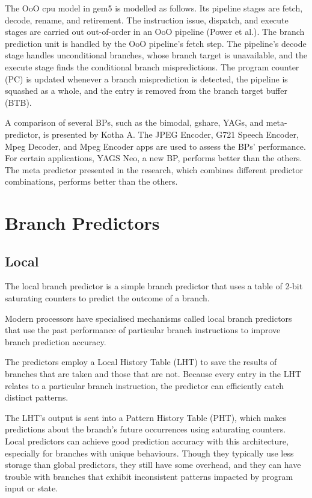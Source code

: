 \documentclass[10pt,journal,compsoc]{IEEEtran}
\begin{document}
The OoO cpu model in gem5 is modelled as follows. Its pipeline stages are fetch, decode, rename, and retirement. 
The instruction issue, dispatch, and execute stages are carried out out-of-order in an OoO pipeline (Power et al.\cite{lowepower2020gem5simulatorversion200}). 
The branch prediction unit is handled by the OoO pipeline's fetch step. The pipeline's decode stage handles unconditional branches, whose branch target is unavailable, and the execute stage finds the conditional branch mispredictions. 
The program counter (PC) is updated whenever a branch misprediction is detected, the pipeline is squashed as a whole, and the entry is removed from the branch target buffer (BTB). 

A comparison of several BPs, such as the bimodal, gshare, YAGs, and meta-predictor, 
is presented by Kotha A\cite{kothaComparativeStudyBranch}. The JPEG Encoder, G721 Speech Encoder, Mpeg Decoder, and Mpeg 
Encoder apps are used to assess the BPs' performance. For certain applications, YAGS Neo, a new BP, 
performs better than the others. The meta predictor presented in the research, 
which combines different predictor combinations, performs better than the others.


\section{Branch Predictors}\label{branchPredictors}

\subsection{Local}
\noindent The local branch predictor is a simple branch predictor that uses a table of 2-bit saturating counters to predict the outcome of a branch.

Modern processors have specialised mechanisms called local branch predictors that use the past performance of particular branch instructions to improve branch prediction accuracy. 

The predictors employ a Local History Table (LHT) to save the results of branches that are taken and those that are not. 
Because every entry in the LHT relates to a particular branch instruction, the predictor can efficiently catch distinct patterns. 

The LHT's output is sent into a Pattern History Table (PHT), which makes predictions about the branch's future occurrences using saturating counters. Local predictors can achieve good prediction accuracy with this architecture, especially for branches with unique behaviours.
Though they typically use less storage than global predictors, they still have some overhead, and they can have trouble with branches that exhibit inconsistent patterns impacted by program input or state. 
\end{document}
